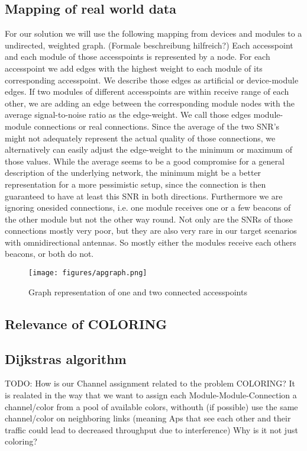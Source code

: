    \subsection{Mapping of real world data}
    For our solution we will use the following mapping from devices and modules to a undirected, weighted graph. (Formale beschreibung hilfreich?)
    Each accesspoint and each module of those accesspoints is represented by a node.
    For each accesspoint we add edges with the highest weight to each module of its corresponding accesspoint. 
    We describe those edges as artificial or device-module edges.
    If two modules of different accesspoints are within receive range of each other, 
    we are adding an edge between the corresponding module nodes with the average signal-to-noise ratio as the edge-weight.
    We call those edges module-module connections or real connections.
    Since the average of the two SNR's might not adequately represent the actual quality of those connections,
    we alternatively can easily adjust the edge-weight to the minimum or maximum of those values.
    While the average seems to be a good compromise for a general description of the underlying network, the minimum might be a better representation for 
    a more pessimistic setup, since the connection is then guaranteed to have at least this SNR in both directions. 
    Furthermore we are ignoring onesided connections, i.e. one module receives one or a few beacons of the other module but not the other way round.
    Not only are the SNRs of those connections mostly very poor, but they are also very rare in our target scenarios with omnidirectional antennas.
    So mostly either the modules receive each others beacons, or both do not.
    \begin{figure}[t]
      \centering
      \texttt{[image: figures/apgraph.png]}
      \caption{Graph representation of one and two connected accesspoints}
      \label{fig:apgraph}
    \end{figure}
   \subsection{Relevance of COLORING}
   \subsection{Dijkstras algorithm}
   TODO: How is our Channel assignment related to the problem COLORING?
    It is realated in the way that we want to assign each Module-Module-Connection a channel/color from a pool of available colors, withouth (if possible) use the same channel/color on neighboring links (meaning Aps that see each other and their traffic could lead to decreased throughput due to interference)
    Why is it not just coloring?
